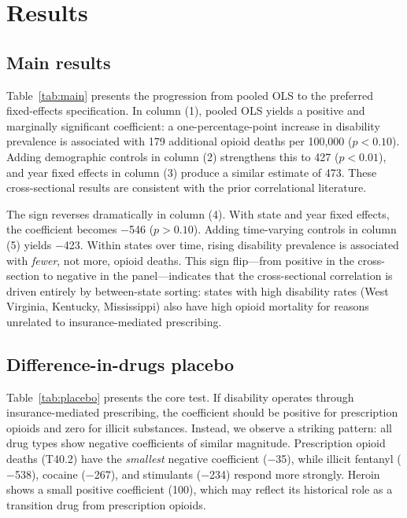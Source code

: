 \documentclass[12pt]{article}
\begin{document}
\section{Results}

\subsection{Main results}

Table~\ref{tab:main} presents the progression from pooled OLS to the preferred fixed-effects specification. In column (1), pooled OLS yields a positive and marginally significant coefficient: a one-percentage-point increase in disability prevalence is associated with 179 additional opioid deaths per 100,000 ($p < 0.10$). Adding demographic controls in column (2) strengthens this to 427 ($p < 0.01$), and year fixed effects in column (3) produce a similar estimate of 473. These cross-sectional results are consistent with the prior correlational literature.

The sign reverses dramatically in column (4). With state and year fixed effects, the coefficient becomes $-$546 ($p > 0.10$). Adding time-varying controls in column (5) yields $-$423. Within states over time, rising disability prevalence is associated with \textit{fewer}, not more, opioid deaths. This sign flip---from positive in the cross-section to negative in the panel---indicates that the cross-sectional correlation is driven entirely by between-state sorting: states with high disability rates (West Virginia, Kentucky, Mississippi) also have high opioid mortality for reasons unrelated to insurance-mediated prescribing.



\subsection{Difference-in-drugs placebo}

Table~\ref{tab:placebo} presents the core test. If disability operates through insurance-mediated prescribing, the coefficient should be positive for prescription opioids and zero for illicit substances. Instead, we observe a striking pattern: all drug types show negative coefficients of similar magnitude. Prescription opioid deaths (T40.2) have the \textit{smallest} negative coefficient ($-$35), while illicit fentanyl ($-$538), cocaine ($-$267), and stimulants ($-$234) respond more strongly. Heroin shows a small positive coefficient (100), which may reflect its historical role as a transition drug from prescription opioids.
\end{document}

